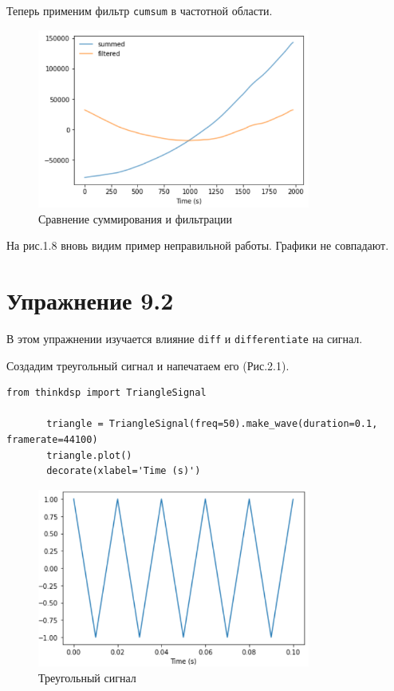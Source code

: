 \documentclass[a4paper,12pt]{report}
\begin{document}
    Теперь применим фильтр \texttt{cumsum} в частотной области.
\begin{figure}[H]
        \centering
        \includegraphics[width=0.8\textwidth]{fig1-8.PNG}
        \caption{Сравнение суммирования и фильтрации}
        \label{fig:fig1-8}
\end{figure} 

    На рис.1.8 вновь видим пример неправильной работы. Графики не совпадают.
         
\chapter{Упражнение 9.2}
    В этом упражнении изучается влияние \texttt{diff} и \texttt{differentiate} на сигнал.
    
    Создадим треугольный сигнал и напечатаем его (Рис.2.1). 
\begin{lstlisting}[caption=Создание треугольного сигнала]
       from thinkdsp import TriangleSignal

       triangle = TriangleSignal(freq=50).make_wave(duration=0.1, framerate=44100)
       triangle.plot()
       decorate(xlabel='Time (s)')
\end{lstlisting}
\begin{figure}[H]
        \centering
        \includegraphics[width=0.8\textwidth]{fig2-1.PNG}
        \caption{Треугольный сигнал}
        \label{fig:fig2-1}
\end{figure} 
\end{document}
